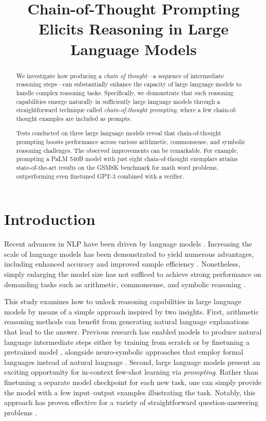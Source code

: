 \title{Chain-of-Thought Prompting Elicits Reasoning in Large Language Models}

\begin{abstract}
We investigate how producing a \textit{chain of thought}—a sequence of intermediate reasoning steps—can substantially enhance the capacity of large language models to handle complex reasoning tasks. Specifically, we demonstrate that such reasoning capabilities emerge naturally in sufficiently large language models through a straightforward technique called \textit{chain-of-thought prompting}, where a few chain-of-thought examples are included as prompts.

Tests conducted on three large language models reveal that chain-of-thought prompting boosts performance across various arithmetic, commonsense, and symbolic reasoning challenges. The observed improvements can be remarkable. For example, prompting a PaLM 540B model with just eight chain-of-thought exemplars attains state-of-the-art results on the GSM8K benchmark for math word problems, outperforming even finetuned GPT-3 combined with a verifier.
\end{abstract}

\section{Introduction}
Recent advances in NLP have been driven by language models \citep[][\textit{inter alia}]{peters-etal-2018-deep,devlin-etal-2019-bert,brown2020language}. Increasing the scale of language models has been demonstrated to yield numerous advantages, including enhanced accuracy and improved sample efficiency \citep[\textit{inter alia}]{kaplan2020scaling,brown2020language}. Nonetheless, simply enlarging the model size has not sufficed to achieve strong performance on demanding tasks such as arithmetic, commonsense, and symbolic reasoning \citep{rae2021scaling}.

This study examines how to unlock reasoning capabilities in large language models by means of a simple approach inspired by two insights. First, arithmetic reasoning methods can benefit from generating natural language explanations that lead to the answer. Previous research has enabled models to produce natural language intermediate steps either by training from scratch \citep{ling-etal-2017-program} or by finetuning a pretrained model \citep{cobbe2021training}, alongside neuro-symbolic approaches that employ formal languages instead of natural language \citep{roy-roth-2015-solving, chiang-chen-2019-semantically,amini-etal-2019-mathqa, chen2019neural}. Second, large language models present an exciting opportunity for in-context few-shot learning via \emph{prompting}. Rather than finetuning a separate model checkpoint for each new task, one can simply provide the model with a few input--output examples illustrating the task. Notably, this approach has proven effective for a variety of straightforward question-answering problems \citep{brown2020language}.

